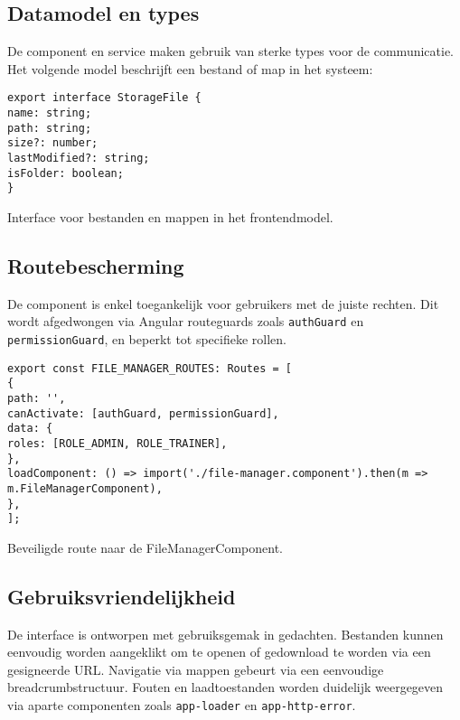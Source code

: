 \subsection{Datamodel en types}
De component en service maken gebruik van sterke types voor de communicatie. Het volgende model beschrijft een bestand of map in het systeem:
\begin{listing}[H]
\begin{verbatim}
export interface StorageFile {
name: string;
path: string;
size?: number;
lastModified?: string;
isFolder: boolean;
}
\end{verbatim}
\caption[Bestandstype in de frontend]{Interface voor bestanden en mappen in het frontendmodel.}
\end{listing}
\subsection{Routebescherming}
De component is enkel toegankelijk voor gebruikers met de juiste rechten. Dit wordt afgedwongen via Angular routeguards zoals \texttt{authGuard} en \texttt{permissionGuard}, en beperkt tot specifieke rollen.
\begin{listing}[H]
\begin{verbatim}
export const FILE_MANAGER_ROUTES: Routes = [
{
path: '',
canActivate: [authGuard, permissionGuard],
data: {
roles: [ROLE_ADMIN, ROLE_TRAINER],
},
loadComponent: () => import('./file-manager.component').then(m => m.FileManagerComponent),
},
];
\end{verbatim}
\caption[Routeconfiguratie]{Beveiligde route naar de FileManagerComponent.}
\end{listing}
\subsection{Gebruiksvriendelijkheid}
De interface is ontworpen met gebruiksgemak in gedachten. Bestanden kunnen eenvoudig worden aangeklikt om te openen of gedownload te worden via een gesigneerde URL. Navigatie via mappen gebeurt via een eenvoudige breadcrumbstructuur. Fouten en laadtoestanden worden duidelijk weergegeven via aparte componenten zoals \texttt{app-loader} en \texttt{app-http-error}.